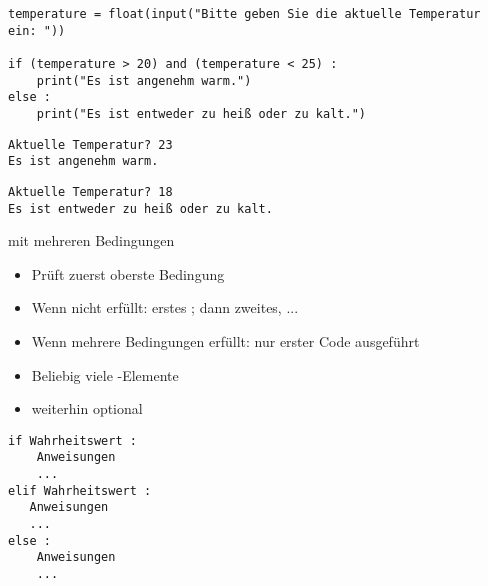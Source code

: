 
\begin{frame}[fragile]
%
\begin{codebox}[Beispiel]
\begin{verbatim}
temperature = float(input("Bitte geben Sie die aktuelle Temperatur ein: "))

if (temperature > 20) and (temperature < 25) :
    print("Es ist angenehm warm.")
else :
    print("Es ist entweder zu heiß oder zu kalt.")
\end{verbatim}
\end{codebox}
%
\begin{cmdbox}[Ausgabebeispiel 1]
\begin{verbatim}
Aktuelle Temperatur? 23
Es ist angenehm warm.
\end{verbatim}
\end{cmdbox}
%
\begin{cmdbox}[Ausgabebeispiel 2]
\begin{verbatim}
Aktuelle Temperatur? 18
Es ist entweder zu heiß oder zu kalt.
\end{verbatim}
\end{cmdbox}
%
\end{frame}


\begin{frame}[fragile]{ mit mehreren Bedingungen}
%
\begin{minipage}[t]{.49\linewidth}
\begin{itemize}
\item Prüft zuerst oberste Bedingung
\item Wenn nicht erfüllt: erstes ; dann zweites, ...
\item Wenn mehrere Bedingungen erfüllt: nur erster Code ausgeführt
\item Beliebig viele -Elemente
\item {} weiterhin optional
\end{itemize}
\end{minipage}
%
\begin{minipage}[t]{.49\linewidth}
\phantom{x}
\begin{codebox}
\begin{verbatim}
if Wahrheitswert :
    Anweisungen
    ...
elif Wahrheitswert :
   Anweisungen
   ...
else :
    Anweisungen
    ...
\end{verbatim}
\end{codebox}
\end{minipage}
%
\end{frame}

